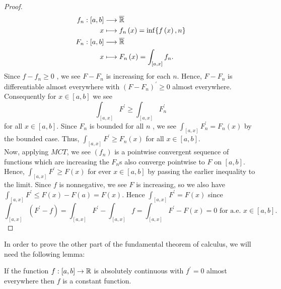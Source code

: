 \begin{proof}
\begin{align*}
	f_{n}: \left[ a, b \right]  &\longrightarrow \overline{\mathbb{R}} \\
	x &\longmapsto f_{n}\left(x  \right) = \inf \{ f\left( x \right) , n  \} \\
	F_{n}: \left[ a, b \right]   &\longrightarrow \overline{\mathbb{R}} \\
	x &\longmapsto F_{n}\left( x \right) = \int_{\left[ a, x \right] }f_{n}
.\end{align*}
Since \(f - f_{n} \ge 0\) , we see \(F - F_{n}\) is increasing for each \(n\). Hence, \(F - F_{n}\) is differentiable almost everywhere with \(\left( F - F_{n} \right)^{\prime} \ge 0 \) almost everywhere. Consequently for \(x \in \left[ a,b \right] \) we see \[
	\int_{\left[ a, x \right] } F^{\prime} \ge \int_{\left[ a, x \right] } F_{n}^{\prime}
\] for all \(x \in \left[ a, b \right] \). Since \(F_{n}\) is bounded for all \(n\) , we see \(\int_{\left[ a, x \right] }F_{n}^{\prime} = F_{n}\left( x \right) \) by the bounded case. Thus, \(\int_{\left[ a, x \right] }F^{\prime} \ge F_{n}\left( x \right) \) for all \(x \in \left[ a, b \right] \).\\
Now, applying \(MCT\), we see \(\left( f_{n} \right) \) is a pointwise convergent sequence of functions which are increasing the \(F_{n}\)s also converge pointwise to \(F\) on \(\left[ a, b \right] \).  Hence, \(\int_{\left[ a, x \right] }F ^{\prime} \ge F\left( x \right) \) for ever \(x \in \left[ a, b \right] \)  by passing the earlier inequality to the limit. Since \(f\) is nonnegative, we see \(F\) is increasing, so we also have \(\int_{\left[ a, x \right] }F^{\prime} \le F\left( x \right) - F\left( a \right) = F\left( x \right) \). Hence \(\int_{\left[ a, x \right] }F^{\prime} = F\left( x \right) \) since \[
	\int_{\left[ a, x \right] }\left( F^{\prime} - f \right) = \int_{\left[ a, x \right] } F^{\prime} - \int_{\left[ a, x \right] } f = \int_{\left[ a, x \right] }F^{\prime} - F\left( x \right) = 0   \text{ for a.e. }  x \in \left[ a ,b \right]
.\]
\end{proof}
In order to prove the other part of the fundamental theorem of calculus, we will need the following lemma:
\begin{lemma}
If the function \(f: \left[ a, b \right]  \to \mathbb{R}\) is absolutely continuous with \(f^{\prime} = 0\) almost everywhere then \(f\) is a constant function.
\end{lemma}
